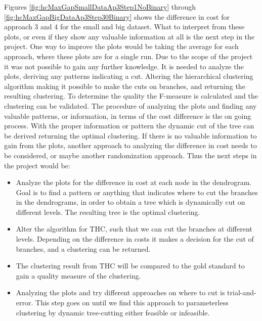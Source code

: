 \documentclass[a4paper,10pt]{article}
\theoremstyle{plain}
\theoremstyle{definition}
\begin{document}
Figures \ref{fig:hcMaxGapSmallDataAp3Step1NoBinary} through \ref{fig:hcMaxGapBigDataAp3Step30Binary} shows the difference in cost for approach 3 and 4 for the small and big dataset. What to interpret from these plots, or even if they show any valuable information at all is the next step in the project. One way to improve the plots would be taking the average for each approach, where these plots are for a single run. Due to the scope of the project it was not possible to gain any further knowledge. It is needed to analyze the plots, deriving any patterns indicating a cut. Altering the hierarchical clustering algorithm making it possible to make the cuts on branches, and returning the resulting clustering. To determine the quality the F-measure is calculated and the clustering can be validated. The procedure of analyzing the plots and finding any valuable patterns, or information, in terms of the cost difference is the on going process. With the proper information or pattern the dynamic cut of the tree can be derived returning the optimal clustering. If there is no valuable information to gain from the plots, another approach to analyzing the difference in cost needs to be considered, or maybe another randomization approach. Thus the next steps in the project would be:
\begin{itemize}
	\item Analyze the plots for the difference in cost at each node in the dendrogram. Goal is to find a pattern or anything that indicates where to cut the branches in the dendrograms, in order to obtain a tree which is dynamically cut on different levels. The resulting tree is the optimal clustering.
	\item Alter the algorithm for THC, such that we can cut the branches at different levels. Depending on the difference in costs it makes a decision for the cut of branches, and a clustering can be returned.
	\item The clustering result from THC will be compared to the gold standard to gain a quality measure of the clustering.
	\item Analyzing the plots and try different approaches on where to cut is trial-and-error. This step goes on until we find this approach to parameterless clustering by dynamic tree-cutting either feasible or infeasible.
\end{itemize}
\end{document}
